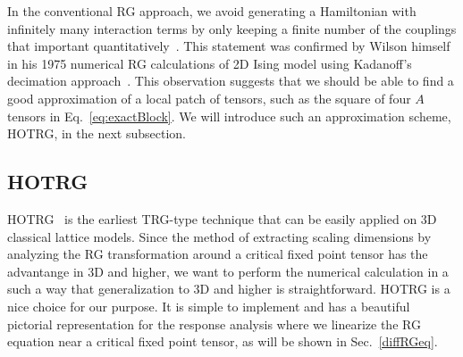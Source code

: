 \documentclass[aps,prb,reprint,superscriptaddress]{revtex4-2}
\begin{document}
In the conventional RG approach, we avoid generating a Hamiltonian with
infinitely many interaction terms by only keeping a finite number of the
couplings that important quantitatively~\cite{wilsonNobel,wilson1970a}.
This statement was confirmed by Wilson himself in his 1975 numerical RG
calculations of 2D Ising model using Kadanoff's decimation
approach~\cite{wilsonNumRG}. This observation suggests that we should be
able to find a good approximation of a local patch of tensors, such as the
square of four $A$ tensors in Eq.~\eqref{eq:exactBlock}. We will
introduce such an approximation scheme, HOTRG, in the next subsection.


\subsection{HOTRG\label{hotrg}}
HOTRG~\cite{hotrg} is the earliest TRG-type technique that can be easily
applied on 3D classical lattice models. Since the method of extracting
scaling dimensions by analyzing the RG transformation around a critical
fixed point tensor has the advantange in 3D and higher, we want to
perform the numerical calculation in a such a way that generalization to
3D and higher is straightforward. HOTRG is a nice choice for our
purpose. It is simple to implement and has a beautiful pictorial
representation for the response analysis where we linearize the RG
equation near a critical fixed point tensor, as will be shown in
Sec.~\ref{diffRGeq}.
%
\end{document}
